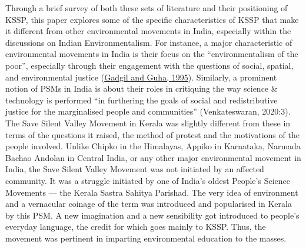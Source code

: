 \documentclass[twoside, 13pt]{article}
\begin{document}
{\fontsize{12}{14}\selectfont Through a brief survey of both these sets of literature and their positioning of KSSP, this paper explores some of the specific characteristics of KSSP that make it different from other environmental movements in India, especially within the discussions on Indian Environmentalism. For instance, a major characteristic of environmental movements in India is their focus on the “environmentalism of the poor”, especially through their engagement with the questions of social, spatial, and environmental justice (\underline{Gadgil and Guha, 1995}). Similarly, a prominent notion of PSMs in India is about their roles in critiquing the way science \& technology is performed “in furthering the goals of social and redistributive justice for the marginalised people and communities” (Venkateswaran, 2020:3). The Save Silent Valley Movement in Kerala was slightly different from these in terms of the questions it raised, the method of protest and the motivations of the people involved. Unlike Chipko in the Himalayas, Appiko in Karnataka, Narmada Bachao Andolan in Central India, or any other major environmental movement in India, the Save Silent Valley Movement was not initiated by an affected community. It was a struggle initiated by one of India’s oldest People’s Science Movements — the Kerala Sastra Sahitya Parishad. The very idea of environment and a vernacular coinage of the term was introduced and popularised in Kerala by this PSM. A new imagination and a new sensibility got introduced to people’s everyday language, the credit for which goes mainly to KSSP. Thus, the movement was pertinent in imparting environmental education to the masses.}
\end{document}
